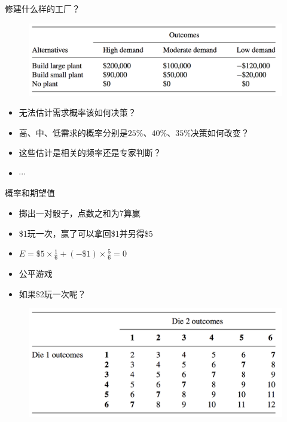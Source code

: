 \documentclass[mathserif, table]{beamer}
\begin{document}
\begin{frame}{修建什么样的工厂？}
  
  \begin{figure}
    \centering
    \includegraphics[width=\textwidth{}]{factories.png}
  \end{figure}

  \begin{itemize}
  \item 无法估计需求概率该如何决策？
  \item 高、中、低需求的概率分别是$25\%$、$40\%$、$35\%$决策如何改变？
  \item 这些估计是相关的频率还是专家判断？
  \item $\cdots$
  \end{itemize}

\end{frame}

\begin{frame}{概率和期望值}

  \begin{itemize}
  \item<1-> 掷出一对骰子，点数之和为7算赢
  \item<1-> \$1玩一次，赢了可以拿回\$1并另得\$5
  \item<2-> $E = \$5 \times \frac{1}{6} + (-\$1) \times \frac{5}{6} = 0$
  \item<3-> 公平游戏
  \item<4-> 如果\$2玩一次呢？
  \end{itemize}
  
  \begin{figure}
    \centering
    \includegraphics[width=\textwidth{}]{dice.png}
  \end{figure}
  
\end{frame}
\end{document}
